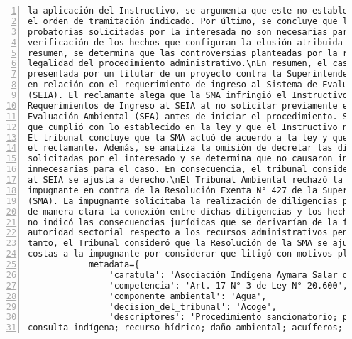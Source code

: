 \begin{Verbatim}[frame=lines, label=Elavoración propia -  Ejemplo de Contexto enviado por el Chatbot a OpenAI
				, fontsize=\footnotesize, numbers=left
				, baselinestretch=0.4
				, formatcom=\color{gray}]
la aplicación del Instructivo, se argumenta que este no establece la obligatoriedad de seguir
el orden de tramitación indicado. Por último, se concluye que las solicitudes de diligencias
probatorias solicitadas por la interesada no son necesarias para confirmar o rechazar la
verificación de los hechos que configuran la elusión atribuida en la resolución impugnada. En
resumen, se determina que las controversias planteadas por la reclamante no afectan la
legalidad del procedimiento administrativo.\nEn resumen, el caso trata sobre una reclamación
presentada por un titular de un proyecto contra la Superintendencia del Medio Ambiente (SMA)
en relación con el requerimiento de ingreso al Sistema de Evaluación de Impacto Ambiental
(SEIA). El reclamante alega que la SMA infringió el Instructivo para la Tramitación de
Requerimientos de Ingreso al SEIA al no solicitar previamente el informe del Servicio de
Evaluación Ambiental (SEA) antes de iniciar el procedimiento. Sin embargo, la SMA argumenta
que cumplió con lo establecido en la ley y que el Instructivo no es de carácter obligatorio.
El tribunal concluye que la SMA actuó de acuerdo a la ley y que no se produjo indefensión para
el reclamante. Además, se analiza la omisión de decretar las diligencias probatorias
solicitadas por el interesado y se determina que no causaron indefensión y que eran
innecesarias para el caso. En consecuencia, el tribunal considera que la resolución de ingreso
al SEIA se ajusta a derecho.\nEl Tribunal Ambiental rechazó la reclamación presentada por la
impugnante en contra de la Resolución Exenta N° 427 de la Superintendencia del Medio Ambiente
(SMA). La impugnante solicitaba la realización de diligencias probatorias, pero no especificó
de manera clara la conexión entre dichas diligencias y los hechos que deseaba probar. Además,
no indicó las consecuencias jurídicas que se derivarían de la falta de pronunciamiento de la
autoridad sectorial respecto a los recursos administrativos pendientes de resolución. Por lo
tanto, el Tribunal consideró que la Resolución de la SMA se ajusta a derecho. No se condenó en
costas a la impugnante por considerar que litigó con motivos plausibles.',
            metadata={
                'caratula': 'Asociación Indígena Aymara Salar de Coposa con SMA ',
                'competencia': 'Art. 17 N° 3 de Ley N° 20.600',
                'componente_ambiental': 'Agua',
                'decision_del_tribunal': 'Acoge',
                'descriptores': 'Procedimiento sancionatorio; programa de cumplimiento;
consulta indígena; recurso hídrico; daño ambiental; acuíferos; criterios; integridad;

\end{Verbatim}
